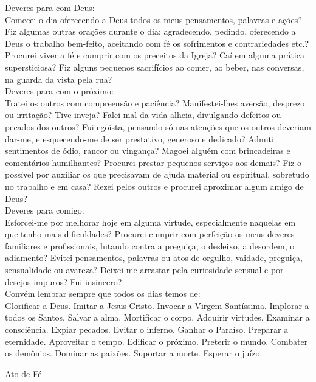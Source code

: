 \documentclass{book}
\begin{document}
\begin{flushleft}
    Deveres para com Deus: \\ Comecei o dia oferecendo a Deus todos os meus pensamentos, palavras e ações? Fiz algumas outras orações durante o dia: agradecendo, pedindo, oferecendo a Deus o trabalho bem-feito, aceitando com fé os sofrimentos e contrariedades etc.? Procurei viver a fé e cumprir com os preceitos da Igreja? Caí em alguma prática supersticiosa? Fiz alguns pequenos sacrifícios ao comer, ao beber, nas conversas, na guarda da vista pela rua?
    \vspace{.2cm} \\
    Deveres para com o próximo: \\ Tratei os outros com compreensão e paciência? Manifestei-lhes aversão, desprezo ou irritação? Tive inveja? Falei mal da vida alheia, divulgando defeitos ou pecados dos outros? Fui egoísta, pensando só nas atenções que os outros deveriam dar-me, e esquecendo-me de ser prestativo, generoso e dedicado? Admiti sentimentos de ódio, rancor ou vingança? Magoei alguém com brincadeiras e comentários humilhantes? Procurei prestar pequenos serviços aos demais? Fiz o possível por auxiliar os que precisavam de ajuda material ou espiritual, sobretudo no trabalho e em casa? Rezei pelos outros e procurei aproximar algum amigo de Deus? \\
    \newpage
    Deveres para comigo: \\ Esforcei-me por melhorar hoje em alguma virtude, especialmente naquelas em que tenho mais dificuldades? Procurei cumprir com perfeição os meus deveres familiares e profissionais, lutando contra a preguiça, o desleixo, a desordem, o adiamento? Evitei pensamentos, palavras ou atos de orgulho, vaidade, preguiça, sensualidade ou avareza? Deixei-me arrastar pela curiosidade sensual e por desejos impuros? Fui insincero?
    \vspace{.2cm} \\
    Convém lembrar sempre que todos os dias temos de: \\ Glorificar a Deus. Imitar a Jesus Cristo. Invocar a Virgem Santíssima. Implorar a todos os Santos. Salvar a alma. Mortificar o corpo. Adquirir virtudes. Examinar a consciência. Expiar pecados. Evitar o inferno. Ganhar o Paraíso. Preparar a eternidade. Aproveitar o tempo. Edificar o próximo. Preterir o mundo. Combater os demônios. Dominar as paixões. Suportar a morte. Esperar o juízo.
\end{flushleft}
\begin{center}
    Ato de Fé
\end{center}
\end{document}
